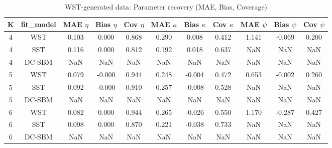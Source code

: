 \begin{table}[!h]
\centering
\caption{WST-generated data: Parameter recovery (MAE, Bias, Coverage)\\\label{tab:wst-params}}
\centering
\begin{tabular}[t]{ccccccccccc}
\toprule
K & fit_model & MAE $\eta$ & Bias $\eta$ & Cov $\eta$ & MAE $\kappa$ & Bias $\kappa$ & Cov $\kappa$ & MAE $\psi$ & Bias $\psi$ & Cov $\psi$\\
\midrule
4 & WST & 0.103 & 0.000 & 0.868 & 0.290 & 0.008 & 0.412 & 1.141 & -0.069 & 0.200\\
4 & SST & 0.116 & 0.000 & 0.812 & 0.192 & 0.018 & 0.637 & NaN & NaN & NaN\\
4 & DC-SBM & NaN & NaN & NaN & NaN & NaN & NaN & NaN & NaN & NaN\\
5 & WST & 0.079 & -0.000 & 0.944 & 0.248 & -0.004 & 0.472 & 0.653 & -0.002 & 0.260\\
5 & SST & 0.092 & -0.000 & 0.910 & 0.257 & -0.008 & 0.528 & NaN & NaN & NaN\\
5 & DC-SBM & NaN & NaN & NaN & NaN & NaN & NaN & NaN & NaN & NaN\\
6 & WST & 0.082 & 0.000 & 0.944 & 0.265 & -0.026 & 0.550 & 1.170 & -0.287 & 0.427\\
6 & SST & 0.098 & 0.000 & 0.870 & 0.221 & -0.038 & 0.733 & NaN & NaN & NaN\\
6 & DC-SBM & NaN & NaN & NaN & NaN & NaN & NaN & NaN & NaN & NaN\\
\bottomrule
\end{tabular}
\end{table}
